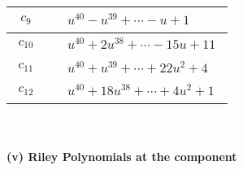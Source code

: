 \documentclass[1p]{elsarticle_modified}
\theoremstyle{definition}
\begin{document}
\begin{tabular}{m{50pt}|m{274pt}}
\hline $$\begin{aligned}c_{9}\end{aligned}$$&$\begin{aligned}
&u^{40}- u^{39}+\cdots- u+1
\end{aligned}$\\
\hline $$\begin{aligned}c_{10}\end{aligned}$$&$\begin{aligned}
&u^{40}+2 u^{38}+\cdots-15 u+11
\end{aligned}$\\
\hline $$\begin{aligned}c_{11}\end{aligned}$$&$\begin{aligned}
&u^{40}+u^{39}+\cdots+22 u^2+4
\end{aligned}$\\
\hline $$\begin{aligned}c_{12}\end{aligned}$$&$\begin{aligned}
&u^{40}+18 u^{38}+\cdots+4 u^2+1
\end{aligned}$\\
\hline
\end{tabular}\\~\\
\newpage\renewcommand{\arraystretch}{1}
\flushleft \textbf{(v) Riley Polynomials at the component}\newline \\
\end{document}

